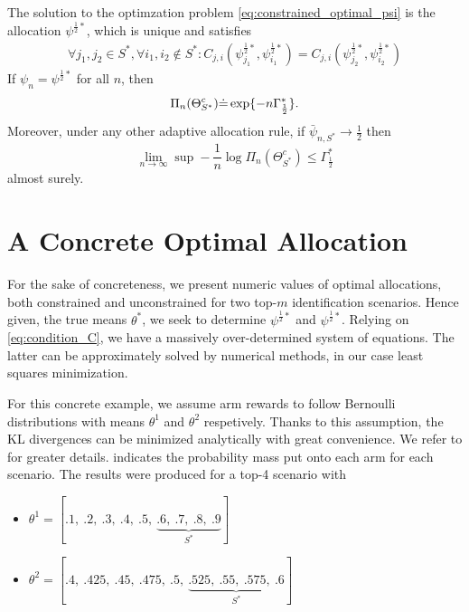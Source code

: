 \begin{proposition}\label{proposition:characterization}
  The solution to the optimzation problem \ref{eq:constrained_optimal_psi} is the allocation $\psi^{\frac{1}{2}*}$, which is unique and satisfies
  \begin{align}
    \forall j_1, j_2 \in S^*, \forall i_1, i_2 \notin S^*: C_{j, i}(\psi^{\frac{1}{2}*}_{j_1}, \psi^{\frac{1}{2}*}_{i_1}) = C_{j, i}(\psi^{\frac{1}{2}*}_{j_2}, \psi^{\frac{1}{2}*}_{i_2})\label{eq:condition_C}
  \end{align}
  If $\psi_n = \psi^{\frac{1}{2}*}$ for all $n$, then
  \[\Pi_n(\Theta_{S^*}^c) \dot{=} \exp \{-n\Gamma^*_{\frac{1}{2}}\}.\]
  Moreover, under any other adaptive allocation rule, if $\bar{\psi}_{n, S^*} \rightarrow \frac{1}{2}$ then
  \[\lim_{n \rightarrow \infty} \sup - \frac{1}{n} \log \Pi_n(\Theta^c_{S^*}) \leq \Gamma^*_{\frac{1}{2}}\]
  almost surely.
\end{proposition}

\section{A Concrete Optimal Allocation}\label{section:conrete_optimal_allocation}
For the sake of concreteness, we present numeric values of optimal allocations, both constrained and unconstrained for two top-$m$ identification scenarios.
Hence given, the true means $\theta^*$, we seek to determine $\psi^{\frac{1}{2}*}$ and $\psi^{\frac{1}{2}*}$. Relying on \eqref{eq:condition_C}, we have a massively over-determined system of equations. The latter can be approximately solved by numerical methods, in our case least squares minimization.

For this concrete example, we assume arm rewards to follow Bernoulli distributions with means $\theta^1$ and $\theta^2$ respetively. Thanks to this assumption, the KL divergences can be minimized analytically with great convenience. We refer to  for greater details.  indicates the probability mass put onto each arm for each scenario. The results were produced for a top-4 scenario with
\begin{itemize}
  \item $\theta^1 = [.1,\ .2,\ .3,\ .4,\ .5,\ \underbrace{.6,\ .7,\ .8,\ .9}_\text{$S^*$}]$
  \item $\theta^2 = [.4,\ .425,\ .45,\ .475,\ .5,\ \underbrace{.525,\ .55,\ .575,\ .6}_\text{$S^*$}]$
\end{itemize}

